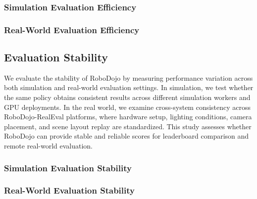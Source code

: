 \subsubsection{Simulation Evaluation Efficiency}



\subsubsection{Real-World Evaluation Efficiency}



\subsection{Evaluation Stability}

We evaluate the stability of RoboDojo by measuring performance variation across both simulation and real-world evaluation settings. In simulation, we test whether the same policy obtains consistent results across different simulation workers and GPU deployments. In the real world, we examine cross-system consistency across RoboDojo-RealEval platforms, where hardware setup, lighting conditions, camera placement, and scene layout replay are standardized. This study assesses whether RoboDojo can provide stable and reliable scores for leaderboard comparison and remote real-world evaluation.

\subsubsection{Simulation Evaluation Stability}



\subsubsection{Real-World Evaluation Stability}


